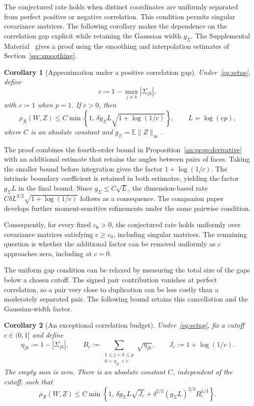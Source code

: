\documentclass[11pt,letterpaper,twoside,leqno]{article}
\theoremstyle{bookplain}
\newtheorem{corollary}{Corollary}
\theoremstyle{bookremark}
\newcommand{\E}{\mathbb E}
\newcommand{\rh}{\rho_{\mathcal R}}
\begin{document}
{
The conjectured rate holds when distinct coordinates are uniformly
separated from perfect positive or negative correlation. This condition
permits singular covariance matrices. The following corollary makes the
dependence on the correlation gap explicit while retaining the Gaussian
width $g_\Sigma$. The Supplemental Material~\cite[Appendix~H]{Supplement2026}
gives a proof using the smoothing
and interpolation estimates of Section~\ref{sec:smoothing}.

\begin{samepage}
\begin{corollary}[Approximation under a positive correlation gap]
\label{cor:positive-correlation-gap}
Under~\eqref{eq:setup}, define
\[
 c\coloneqq 1-\max_{j\ne k}|\Sigma_{jk}|,
\]
with \(c\coloneqq 1\) when \(p=1\). If \(c>0\), then
\[
 \rh(W,Z)\le C\min\left\{1,\,
 \delta g_\Sigma L\sqrt{1+\log(1/c)}\right\},
 \qquad L=\log(ep),
\]
where \(C\) is an absolute constant and $g_\Sigma=\E\|Z\|_\infty$.
\end{corollary}
\end{samepage}

The proof combines the fourth-order bound in
Proposition~\ref{an:prop:derivative} with an additional estimate that
retains the angles between pairs of faces. Taking the smaller bound
before integration gives the factor \(1+\log(1/c)\). The intrinsic
boundary coefficient is retained in both estimates, yielding the factor
$g_\Sigma L$ in the final bound. Since $g_\Sigma\le C\sqrt L$, the
dimension-based rate $C\delta L^{3/2}\sqrt{1+\log(1/c)}$ follows as a
consequence. The companion paper~\cite{CorrelationGap} develops further
moment-sensitive refinements under the same pairwise condition.

Consequently, for every fixed \(c_0>0\), the conjectured rate holds
uniformly over covariance matrices satisfying \(c\ge c_0\), including
singular matrices. The remaining question is whether the additional
factor can be removed uniformly as \(c\) approaches zero, including at
\(c=0\).
}

The uniform gap condition can be relaxed by measuring the total size of
the gaps below a chosen cutoff. The signed pair contribution vanishes
at perfect correlation, so a pair very close to duplication can be
less costly than a moderately separated pair. The following bound
retains this cancellation and the Gaussian-width factor.

\begin{corollary}[An exceptional correlation budget]
\label{cor:correlation-budget}
Under~\eqref{eq:setup}, fix a cutoff $c\in(0,1]$ and define
\[
 \eta_{jk}:=1-|\Sigma_{jk}|,\qquad
 B_c:=\sum_{\substack{1\le j<k\le p\\0<\eta_{jk}<c}}\sqrt{\eta_{jk}},
 \qquad J_c:=1+\log(1/c).
\]
The empty sum is zero. There is an absolute constant $C$, independent
of the cutoff, such that
\begin{equation}
 \rh(W,Z)\le C\min\left\{1,\,
      \delta g_\Sigma L\sqrt{J_c}
      +\delta^{2/3}(g_\Sigma L)^{2/3}B_c^{1/3}\right\}.
 \label{budget:eq:result}
\end{equation}
\end{corollary}
\end{document}
